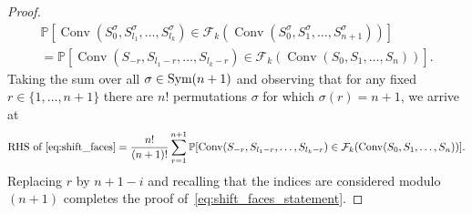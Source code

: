 \documentclass[12pt, reqno]{amsart}
\theoremstyle{plain}
\theoremstyle{definition}
\theoremstyle{remark}
\begin{document}
\begin{proof}
\begin{multline*}
{\mathbb{P}}[{\mathop{\mathrm{Conv}}\nolimits} (S_0^{\sigma}, S_{l_1}^\sigma,\ldots, S_{l_{k}}^\sigma) \in {\mathcal{F}}_k({\mathop{\mathrm{Conv}}\nolimits} (S_0^{\sigma},S_1^{\sigma}, \ldots, S_{n+1}^{\sigma}))]
\\=
{\mathbb{P}}[{\mathop{\mathrm{Conv}}\nolimits} (S_{-r}, S_{l_1-r},\ldots, S_{l_{k}-r})
\in {\mathcal{F}}_k({\mathop{\mathrm{Conv}}\nolimits} (S_0,S_1, \ldots, S_{n}))].
\end{multline*}
Taking the sum over all $\sigma \in {\text{\rm Sym}}(n+1)$ and observing that for any fixed $r\in \{1,\ldots,n+1\}$ there are $n!$ permutations $\sigma$ for which $\sigma(r) = n+1$, we arrive at
\begin{multline*}
\text{RHS of~\eqref{eq:shift_faces}}
= \frac{n!}{(n+1)!} \sum_{r=1}^{n+1} {\mathbb{P}}[{\mathop{\mathrm{Conv}}\nolimits} (S_{-r}, S_{l_1-r},\ldots, S_{l_{k}-r})
\in {\mathcal{F}}_k({\mathop{\mathrm{Conv}}\nolimits} (S_0,S_1, \ldots, S_{n}))].
\end{multline*}
Replacing $r$ by $n+1-i$ and recalling that the indices are considered modulo $(n+1)$ completes the proof of~\eqref{eq:shift_faces_statement}.
\end{proof}
\end{document}
